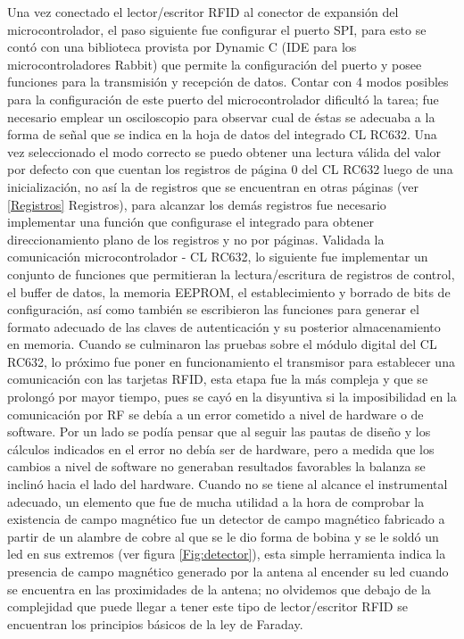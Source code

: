 Una vez conectado el lector/escritor RFID al conector de expansión del microcontrolador, el paso siguiente fue configurar el puerto SPI, para esto se contó con una biblioteca provista por Dynamic C (IDE para los microcontroladores Rabbit) que permite la configuración del puerto y posee funciones para la transmisión y recepción de datos. Contar con 4 modos posibles para la configuración de este puerto del microcontrolador dificultó la tarea; fue necesario emplear un osciloscopio para observar cual de éstas se adecuaba a la forma de señal que se indica en la hoja de datos del integrado  CL RC632. Una vez seleccionado el modo correcto se puedo obtener una lectura válida del valor por defecto con que cuentan los registros de página 0 del CL RC632 luego de una inicialización, no así la de registros que se encuentran en otras páginas (ver \ref{Registros} Registros), para alcanzar los demás registros fue necesario implementar una función que configurase el integrado para obtener direccionamiento plano de los registros y no por páginas.
Validada la comunicación microcontrolador - CL RC632, lo siguiente fue implementar un conjunto de funciones que permitieran la lectura/escritura de registros de control, el buffer de datos, la memoria EEPROM, el establecimiento y borrado de bits de configuración, así como también se escribieron las funciones para generar el formato adecuado de las claves de autenticación y su posterior almacenamiento en memoria. 
Cuando se culminaron las pruebas sobre el módulo digital del  CL RC632, lo próximo fue poner en funcionamiento el transmisor para establecer una comunicación con las tarjetas RFID, esta etapa fue la más compleja y que se prolongó por mayor tiempo, pues se cayó en la disyuntiva si la imposibilidad en la comunicación por RF se debía a un error cometido a nivel de hardware o de software. Por un lado se podía pensar que al seguir las pautas de diseño y los cálculos indicados en \cite{MRICF} el error no debía ser de hardware, pero a medida que los cambios a nivel de software no generaban resultados favorables la balanza se inclinó hacia el lado del hardware. Cuando no se tiene al alcance el instrumental adecuado, un elemento que fue de mucha utilidad a la hora de comprobar la existencia de campo magnético fue un detector de campo magnético fabricado a partir de un alambre de cobre al que se le dio forma de bobina y se le soldó un led en sus extremos (ver figura \ref{Fig:detector}), esta simple herramienta indica la presencia de campo magnético generado por la antena al encender su led cuando se encuentra en las proximidades de la antena; no olvidemos que debajo de la complejidad que puede llegar a tener este tipo de lector/escritor RFID se encuentran los principios básicos de la ley de Faraday. 


